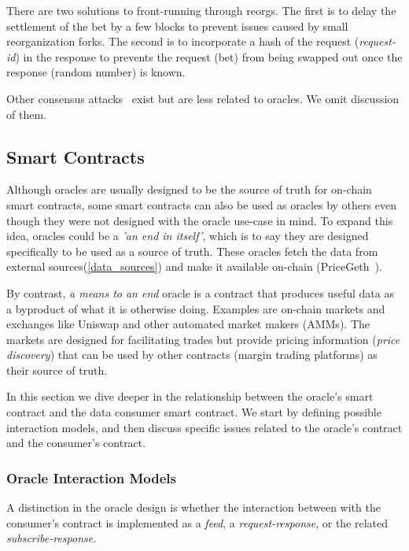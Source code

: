 There are two solutions to front-running through reorgs. The first is to delay the settlement of the bet by a few blocks to prevent issues caused by small reorganization forks. The second is to incorporate a hash of the request (\eg \textit{request-id}) in the response to prevents the request (\eg bet) from being swapped out once the response (\eg random number) is known.

Other consensus attacks~\cite{gramoli2020blockchain,bissias2016analysis,henningsen2019eclipsing} exist but are less related to oracles. We omit discussion of them.


\subsection{Smart Contracts}  \label{smart_contract}

Although oracles are usually designed to be the source of truth for on-chain smart contracts, some smart contracts can also be used as oracles by others even though they were not designed with the oracle use-case in mind. To expand this idea, oracles could be a \emph{'an end in itself'}, which is to say they are designed specifically to be used as a source of truth. These oracles fetch the data from external sources(\ref{data_sources}) and make it available on-chain (\eg PriceGeth~\cite{eskandari2017feasibility}).

By contrast, \emph{a means to an end} oracle is a contract that produces useful data as a byproduct of what it is otherwise doing. Examples are on-chain markets and exchanges like Uniswap and other automated market makers (AMMs). The markets are designed for facilitating trades but provide pricing information (\emph{price discovery}) that can be used by other contracts (\eg margin trading platforms) as their source of truth.

In this section we dive deeper in the relationship between the oracle's smart contract and the data consumer smart contract. We start by defining possible interaction models, and then discuss specific issues related to the oracle's contract and the consumer's contract. 

\subsubsection{Oracle Interaction Models}

A distinction in the oracle design is whether the interaction between with the consumer's contract is implemented as a \textit{feed}, a \textit{request-response}, or the related \textit{subscribe-response}.

